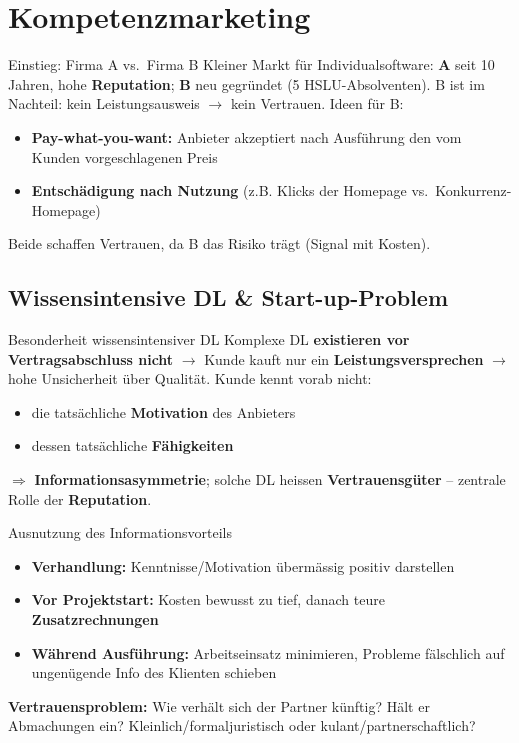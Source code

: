 \documentclass[a4paper, fontsize=7pt]{scrartcl}
\begin{document}
\section{Kompetenzmarketing}

\begin{subbox}{Einstieg: Firma A vs.\ Firma B}
Kleiner Markt für Individualsoftware: \textbf{A} seit 10 Jahren, hohe
\textbf{Reputation}; \textbf{B} neu gegründet (5 HSLU-Absolventen). B ist
im Nachteil: kein Leistungsausweis $\to$ kein Vertrauen. Ideen für B:
\begin{itemize}
    \item \textbf{Pay-what-you-want:} Anbieter akzeptiert nach Ausführung
    den vom Kunden vorgeschlagenen Preis
    \item \textbf{Entschädigung nach Nutzung} (z.B. Klicks der Homepage
    vs.\ Konkurrenz-Homepage)
\end{itemize}
Beide schaffen Vertrauen, da B das Risiko trägt (Signal mit Kosten).
\end{subbox}

\subsection{Wissensintensive DL \& Start-up-Problem}

\begin{mainbox}{Besonderheit wissensintensiver DL}
Komplexe DL \textbf{existieren vor Vertragsabschluss nicht} $\to$ Kunde
kauft nur ein \textbf{Leistungsversprechen} $\to$ hohe Unsicherheit über
Qualität. Kunde kennt vorab nicht:
\begin{itemize}
    \item die tatsächliche \textbf{Motivation} des Anbieters
    \item dessen tatsächliche \textbf{Fähigkeiten}
\end{itemize}
$\Rightarrow$ \textbf{Informationsasymmetrie}; solche DL heissen
\textbf{Vertrauensgüter} -- zentrale Rolle der \textbf{Reputation}.
\end{mainbox}

\begin{mainbox}{Ausnutzung des Informationsvorteils}
\begin{itemize}
    \item \textbf{Verhandlung:} Kenntnisse/Motivation übermässig positiv
    darstellen
    \item \textbf{Vor Projektstart:} Kosten bewusst zu tief, danach teure
    \textbf{Zusatzrechnungen}
    \item \textbf{Während Ausführung:} Arbeitseinsatz minimieren, Probleme
    fälschlich auf ungenügende Info des Klienten schieben
\end{itemize}
\textbf{Vertrauensproblem:} Wie verhält sich der Partner künftig? Hält er
Abmachungen ein? Kleinlich/formaljuristisch oder kulant/partnerschaftlich?
\end{mainbox}
\end{document}
